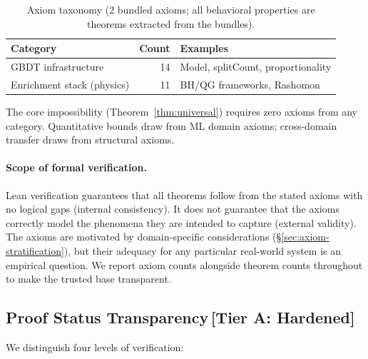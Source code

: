 \documentclass[11pt,a4paper]{article}
\begin{document}
\begin{table}[h]
\centering
\small
\caption{Axiom taxonomy (2 bundled axioms; all behavioral properties are theorems extracted from the bundles).}
\label{tab:axiom-taxonomy}
\begin{tabular}{lrl}
\toprule
Category & Count & Examples \\
\midrule
GBDT infrastructure & 14 & Model, splitCount, proportionality \\
Enrichment stack (physics) & 11 & BH/QG frameworks, Rashomon \\
\bottomrule
\end{tabular}
\end{table}

\noindent The core impossibility (Theorem~\ref{thm:universal}) requires zero axioms from any category. Quantitative bounds draw from ML domain axioms; cross-domain transfer draws from structural axioms.

\paragraph{Scope of formal verification.}
Lean verification guarantees that all theorems follow from the stated axioms with no logical gaps (internal consistency). It does not guarantee that the axioms correctly model the phenomena they are intended to capture (external validity). The axioms are motivated by domain-specific considerations (\S\ref{sec:axiom-stratification}), but their adequacy for any particular real-world system is an empirical question. We report axiom counts alongside theorem counts throughout to make the trusted base transparent.

\subsection{Proof Status Transparency\,\textnormal{\normalsize[Tier A: Hardened]}}
\label{sec:proof-status}

We distinguish four levels of verification:
\end{document}
